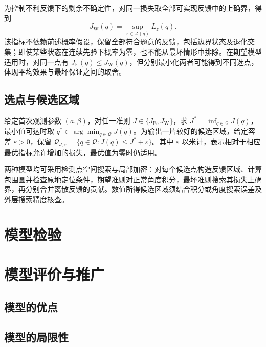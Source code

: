\documentclass[UTF8,a4paper,zihao=-4,fontset=none]{ctexart}
\begin{document}
为控制不利反馈下的剩余不确定性，对同一损失取全部可实现反馈中的上确界，得到
\begin{equation}
 J_{\mathrm W}(q)=\sup_{z\in\mathcal Z(q)}L_z(q).
\label{eq:q2-pair-worst-objective}
\end{equation}
该指标不依赖前述概率假设，保留全部符合题意的反馈，包括边界状态及退化交集；即使某些状态在连续先验下概率为零，也不能从最坏情形中排除。在期望模型适用时，对同一点有 \(J_{\mathrm E}(q)\le J_{\mathrm W}(q)\)，但分别最小化两者可能得到不同选点，体现平均效果与最坏保证之间的取舍。

\subsection{选点与候选区域}

给定首次观测参数 \((a,\beta)\)，对任一准则 \(J\in\{J_{\mathrm E},J_{\mathrm W}\}\)，求 \(J^*=\inf_{q\in\mathcal Q}J(q)\)，最小值可达时取 \(q^*\in\arg\min_{q\in\mathcal Q}J(q)\)。为输出一片较好的候选区域，给定容差 \(\varepsilon>0\)，保留 \(\mathcal Q_{J,\varepsilon}=\{q\in\mathcal Q:J(q)\le J^*+\varepsilon\}\)。其中 \(\varepsilon\) 以米计，表示相对于相应最优指标允许增加的损失，最优值为零时仍适用。

两种模型均可采用检测点空间搜索与局部加密：对每个候选点构造反馈区域、计算包围圆并检查原地定位条件，期望准则对正常角度积分，最坏准则搜索其损失上确界，再分别合并离散反馈的贡献。数值所得候选区域须结合积分或角度搜索误差及外层搜索精度核查。




\section{模型检验}


\section{模型评价与推广}

\subsection{模型的优点}


\subsection{模型的局限性}
\end{document}
